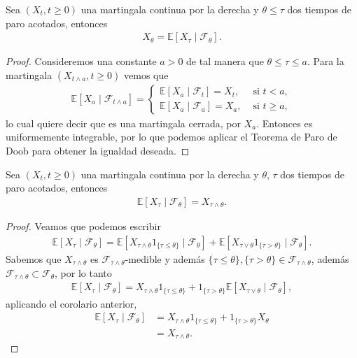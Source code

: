\begin{corollary}
Sea $(X_t, t \geq 0)$ una martingala continua por la derecha y $\theta \leq \tau$ dos tiempos de paro acotados, entonces
\begin{align*}
X_{\theta} = \mathbb{E}[X_{\tau} \mid \mathcal{F}_{\theta}].
\end{align*}
\end{corollary}
\begin{proof}
Consideremos una constante $a > 0$ de tal manera que $\theta \leq \tau \leq a$. Para la martingala $(X_{t \wedge a}, t \geq 0)$ vemos que 
\begin{align*}
\mathbb{E}[X_a \mid \mathcal{F}_{t \wedge a}] = 
\begin{cases}
\mathbb{E}[X_a \mid \mathcal{F}_t] = X_t, & \text{ si } t < a, \\
\mathbb{E}[X_a \mid \mathcal{F}_a] = X_a, & \text{ si } t \geq a,
\end{cases}
\end{align*}
lo cual quiere decir que es una martingala cerrada, por $X_a$. Entonces es uniformemente integrable, por lo que podemos aplicar el Teorema de Paro de Doob para obtener la igualdad deseada.
\end{proof}

\begin{corollary}
\label{coro_teodoob}
Sea $(X_t, t \geq 0)$ una martingala continua por la derecha y $\theta$, $\tau$ dos tiempos de paro acotados, entonces
\begin{align*}
\mathbb{E}[X_{\tau} \mid \mathcal{F}_{\theta}] = X_{\tau \wedge \theta}.
\end{align*}
\end{corollary}
\begin{proof}
Veamos que podemos escribir 
\begin{align*}
\mathbb{E}[X_{\tau} \mid \mathcal{F}_{\theta}] = \mathbb{E}[X_{\tau \wedge \theta} 1_{\{ \tau \leq \theta \}} \mid \mathcal{F}_{\theta}] + \mathbb{E}[X_{\tau \vee \theta} 1_{\{ \tau > \theta \}} \mid \mathcal{F}_{\theta}].
\end{align*}
Sabemos que $X_{\tau \wedge \theta}$ es $\mathcal{F}_{\tau \wedge \theta}$-medible y además $\{ \tau \leq \theta \}, \{ \tau > \theta \} \in \mathcal{F}_{\tau \wedge \theta}$, además $\mathcal{F}_{\tau \wedge \theta} \subset \mathcal{F}_{\theta}$, por lo tanto
\begin{align*}
\mathbb{E}[X_{\tau} \mid \mathcal{F}_{\theta}] = X_{\tau \wedge \theta} 1_{\{ \tau \leq \theta \}} + 1_{\{ \tau > \theta \}} \mathbb{E}[X_{\tau \vee \theta} \mid \mathcal{F}_{\theta}],
\end{align*}
aplicando el corolario anterior, 
\begin{align*}
\mathbb{E}[X_{\tau} \mid \mathcal{F}_{\theta}] & = X_{\tau \wedge \theta} 1_{\{ \tau \leq \theta \}} + 1_{\{ \tau > \theta \}} X_{\theta} \\
& =  X_{\tau \wedge \theta}.
\end{align*}
\end{proof}


